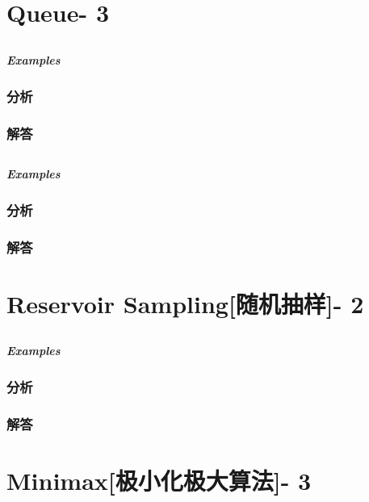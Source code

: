 \documentclass[UTF8,a4paper,12pt]{ctexbook}
\begin{document}
\section{Queue- 3}
	\subsection{}
	
		\subparagraph{Examples}
		
		\subsubsection{分析}
	
		\subsubsection{解答}
	
	\subsection{}
	
		\subparagraph{Examples}
	
		\subsubsection{分析}
	
		\subsubsection{解答}

\section{Reservoir Sampling[随机抽样]- 2}
	\subsection{}
	
		\subparagraph{Examples}
	
		\subsubsection{分析}
	
		\subsubsection{解答}
		
\section{Minimax[极小化极大算法]- 3}
\end{document}
